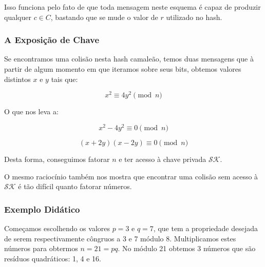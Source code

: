 \documentclass[a4paper]{article}
\begin{document}
    Isso funciona pelo fato de que toda mensagem neste esquema é capaz de
    produzir qualquer $c \in C$, bastando que se mude o valor de $r$
    utilizado no hash.
    
    \subsubsection{A Exposição de Chave}
    
    Se encontramos uma colisão nesta hash camaleão, temos duas mensagens
    que à partir de algum momento em que iteramos sobre seus bits, obtemos
    valores distintos $x$ e $y$ tais que:
    
    $$
    x^2 \equiv 4y^2 \pmod n
    $$
    
    O que nos leva a:
    
    $$
    x^2 - 4y^2 \equiv 0 \pmod n
    $$
    
    $$
    (x+2y)(x-2y) \equiv 0 \pmod n
    $$
    
    Desta forma, conseguimos fatorar $n$ e ter acesso à chave privada
    $\mathcal{SK}$.
    
    O mesmo raciocínio também nos mostra que encontrar uma colisão sem
    acesso à $\mathcal{SK}$ é tão difícil quanto fatorar números.
    
    
    
    
    
      
    
    \subsubsection{Exemplo Didático}
    
    Começamos escolhendo os valores $p=3$ e $q=7$, que tem a propriedade
    desejada de serem respectivamente côngruos a 3 e 7 módulo
    8. Multiplicamos estes números para obtermos $n = 21 = pq$. No módulo
    21 obtemos 3 números que são resíduos quadráticos: 1, 4 e 16.
    
\end{document}
